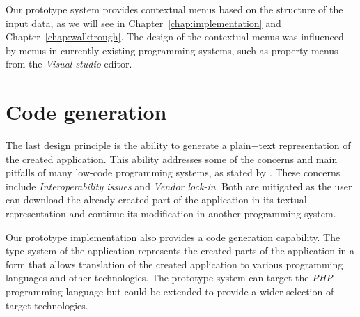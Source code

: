 Our prototype system provides contextual menus based on the structure of the input data, as we will see in Chapter~\ref{chap:implementation} and Chapter~\ref{chap:walktrough}.
The design of the contextual menus was influenced by menus in currently existing programming systems, such as property menus from the \emph{Visual studio} editor.

\section{Code generation}

The last design principle is the ability to generate a plain−text representation of the created application.
This ability addresses some of the concerns and main pitfalls of many low-code programming systems, as stated by \citet{Pinho_Aguiar_Amaral_2023}.
These concerns include \emph{Interoperability issues} and \emph{Vendor lock-in}.
Both are mitigated as the user can download the already created part of the application in its textual representation and continue its modification in another programming system.

Our prototype implementation also provides a code generation capability.
The type system of the application represents the created parts of the application in a form that allows translation of the created application to various programming languages and other technologies.
The prototype system can target the \emph{PHP} programming language but could be extended to provide a wider selection of target technologies.













